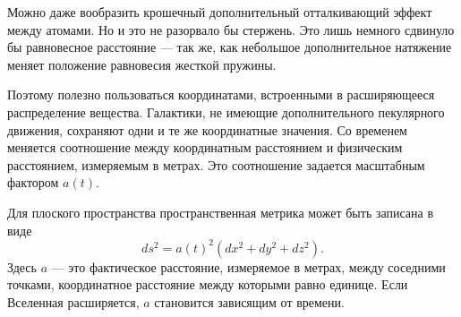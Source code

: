 \begin{classroomqa}
\end{classroomqa}

Можно даже вообразить крошечный дополнительный отталкивающий эффект между атомами. Но и это не разорвало бы стержень. Это лишь немного сдвинуло бы равновесное расстояние — так же, как небольшое дополнительное натяжение меняет положение равновесия жесткой пружины.

\begin{classroomqa}
\end{classroomqa}

Поэтому полезно пользоваться координатами, встроенными в расширяющееся распределение вещества. Галактики, не имеющие дополнительного пекулярного движения, сохраняют одни и те же координатные значения. Со временем меняется соотношение между координатным расстоянием и физическим расстоянием, измеряемым в метрах. Это соотношение задается масштабным фактором \(a(t)\).

Для плоского пространства пространственная метрика может быть записана в виде
\begin{equation}
ds^2 = a(t)^2\left(dx^2+dy^2+dz^2\right).
\end{equation}
Здесь \(a\) — это фактическое расстояние, измеряемое в метрах, между соседними точками, координатное расстояние между которыми равно единице. Если Вселенная расширяется, \(a\) становится зависящим от времени.

